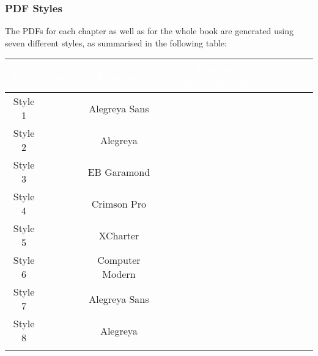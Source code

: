 \subsubsection{PDF Styles}\label{subsubsection-pdf-styles}
The PDFs for each chapter as well as for the whole book are generated using seven different styles, as summarised in the following table:
\begingroup%
\renewcommand{\arraystretch}{1.2}
\begin{center}
    \begin{tabular}{|Sc|Sc|Sc|Sc|}\hline{}
        \textcolor{white}{\textbf{Style}} & \textcolor{white}{\textbf{Class}} & \textcolor{white}{\textbf{Typeface}} & \textcolor{white}{\textbf{Theorem Environments}}\\\hline{}
        Style 1                           &                        & Alegreya Sans                        &                                    \\
        Style 2                           &                        & Alegreya                             &                                    \\
        Style 3                           &                        & EB Garamond                          &                                    \\
        Style 4                           &                        & Crimson Pro                          &                                    \\
        Style 5                           &                        & XCharter                             &                                    \\
        Style 6                           &                        & Computer Modern                      &                                    \\
        Style 7                           &                        & Alegreya Sans                        &                                    \\
        Style 8                           &                        & Alegreya                             &                                    \\

\end{tabular}
\end{center}
